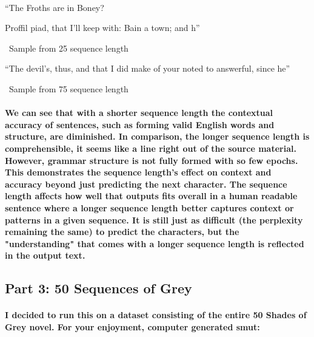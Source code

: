 \documentclass[10pt,a4paper]{report}
\begin{document}
\
\vspace{5mm}

``The Froths are in Boney?

Proffil
piad, that I'll keep with:
Bain a town; and h''

\ 
Sample from 25 sequence length
\vspace{5mm}

``The devil's, thus, and that I did make of your noted to answerful, since he''

\ 
Sample from 75 sequence length
\

\paragraph{
We can see that with a shorter sequence length the contextual accuracy of sentences, such as forming valid English words and structure, are diminished. In comparison, the longer sequence length is comprehensible, it seems like a line right out of the source material. However, grammar structure is not fully formed with so few epochs. This demonstrates the sequence length's effect on context and accuracy beyond just predicting the next character. The sequence length affects how well that outputs fits overall in a human readable sentence where a longer sequence length better captures context or patterns in a given sequence. It is still just as difficult (the perplexity remaining the same) to predict the characters, but the "understanding" that comes with a longer sequence length is reflected in the output text.
}

\clearpage

\subsection{Part 3: 50 Sequences of Grey}

\paragraph{I decided to run this on a dataset consisting of the entire 50 Shades of Grey novel. For your enjoyment, computer generated smut:}
\end{document}
